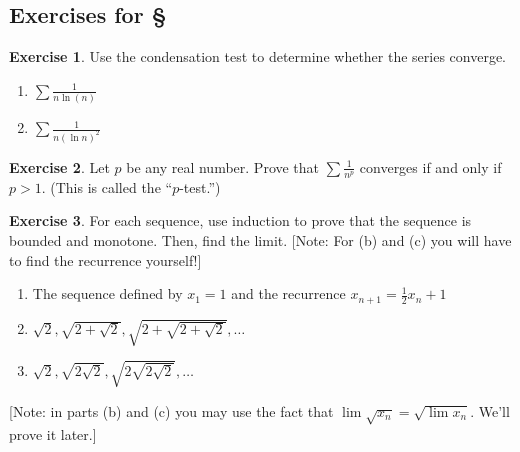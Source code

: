 \documentclass[11pt,oneside]{amsbook}
\theoremstyle{definition}
\newtheorem{exerc}{Exercise}[section]
\theoremstyle{plain}
\newtheorem{cor}[thm]{Corollary}
\theoremstyle{definition}
\theoremstyle{remark}
\newtheorem{example}[thm]{Example}
\numberwithin{equation}{section}
\numberwithin{figure}{section}
\begin{document}


\newpage
\subsection*{Exercises for \S \thesection}

\begin{exerc}
  Use the condensation test to determine whether the series converge.
  \begin{enumerate}
    \item $\sum\frac{1}{n\ln(n)}$
    \item $\sum\frac{1}{n(\ln n)^2}$
  \end{enumerate}
\end{exerc}
 
\begin{exerc}
  Let $p$ be any real number. Prove that $\sum\frac1{n^p}$ converges if and only if $p>1$. (This is called the ``$p$-test.'')
\end{exerc}

\begin{exerc}
  For each sequence, use induction to prove that the sequence is bounded and monotone. Then, find the limit.  [Note: For (b) and (c) you will have to find the recurrence yourself!]
  \begin{enumerate}
    \item The sequence defined by $x_1=1$ and the recurrence $x_{n+1}=\frac12x_n+1$
    \item $\sqrt{2},\sqrt{2+\sqrt{2}},\sqrt{2+\sqrt{2+\sqrt{2}}},\ldots$
    \item $\sqrt{2},\sqrt{2\sqrt{2}},\sqrt{2\sqrt{2\sqrt{2}}},\ldots$
  \end{enumerate}
  [Note: in parts (b) and (c) you may use the fact that $\lim\sqrt{x_n}=\sqrt{\lim x_n}$. We'll prove it later.]
\end{exerc}
\end{document}
